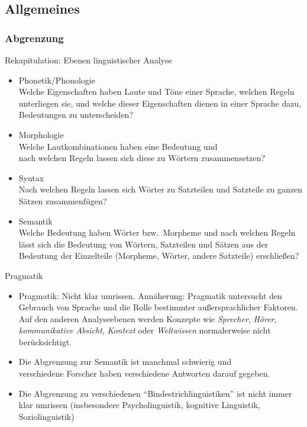 \subsection{Allgemeines}

\subsubsection{Abgrenzung}

\begin{frame}{Rekapitulation: Ebenen linguistischer Analyse}

  \begin{itemize}
  \item Phonetik/Phonologie\\
Welche Eigenschaften haben Laute und Töne einer Sprache, welchen Regeln unterliegen sie, und welche dieser Eigenschaften dienen in einer Sprache dazu, Bedeutungen zu unterscheiden?
  \item<2-> Morphologie\\
   Welche Lautkombinationen haben eine Bedeutung und\\ nach welchen Regeln lassen sich diese zu Wörtern zusammensetzen?
  \item<3-> Syntax\\
 Nach welchen Regeln lassen sich Wörter zu Satzteilen und Satzteile zu ganzen Sätzen zusammenfügen?
  \item<4-> Semantik\\
 Welche Bedeutung haben Wörter bzw.\ Morpheme und nach welchen Regeln lässt sich die Bedeutung von Wörtern,
 Satzteilen und Sätzen aus der Bedeutung der Einzelteile (Morpheme, Wörter, andere Satzteile) erschließen?
  \end{itemize}
\end{frame}

\begin{frame}{Pragmatik}
  \begin{itemize}
  \item Pragmatik: Nicht klar umrissen. Annäherung: Pragmatik untersucht den Gebrauch von Sprache
    und die Rolle bestimmter außersprachlicher Faktoren.\\
        Auf den anderen Analyseebenen werden Konzepte wie \emph{Sprecher}, \emph{Hörer}, \emph{kommunikative Absicht}, \emph{Kontext} oder \emph{Weltwissen} normalerweise nicht berücksichtigt.
  \item<2-> Die Abgrenzung zur Semantik ist manchmal schwierig und\\
            verschiedene Forscher haben verschiedene Antworten darauf gegeben.
  \item<3-> Die Abgrenzung zu verschiedenen "`Bindestrichlinguistiken"' ist nicht immer klar umrissen (insbesondere Psycholinguistik, kognitive Linguistik, Soziolinguistik)
  \end{itemize}

\end{frame}


